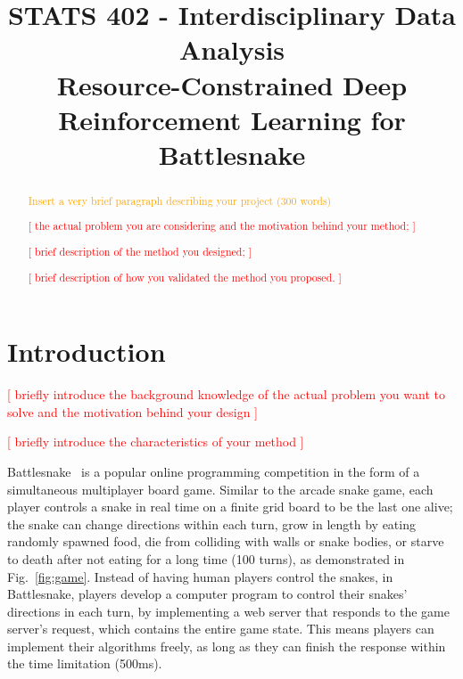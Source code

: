 \documentclass[conference]{IEEEtran}
\title{STATS 402 - Interdisciplinary Data Analysis\\
    Resource-Constrained Deep Reinforcement Learning for Battlesnake
}
\author{\IEEEauthorblockN{Steven Hé (Sīchàng)\\
    sichang.he@dukekunshan.edu.cn
}}
\newcommand{\todo}[1]{\textcolor{red}{[ #1 ]}}
\newcommand{\instruction}[1]{\textcolor{orange}{#1}}
\begin{document}
\maketitle

\begin{abstract}
    \instruction{Insert a very brief paragraph describing your project (300 words)}

    \todo{the actual problem you are considering and the motivation behind your method;}

    \todo{brief description of the method you designed;}

    \todo{brief description of how you validated the method you proposed.}
\end{abstract}

\section{Introduction}

\todo{briefly introduce the background knowledge of the actual problem
    you want to solve and the motivation behind your design
}

\todo{briefly introduce the characteristics of your method}

Battlesnake~\cite{battlesnake}
is a popular online programming competition in the form of a simultaneous
multiplayer board game. Similar to the arcade snake game,
each player controls a snake in real time on a finite grid board to be the last
one alive; the snake can change directions within each turn,
grow in length by eating randomly spawned food,
die from colliding with walls or snake bodies,
or starve to death after not eating for a long time (100 turns),
as demonstrated in Fig.~\ref{fig:game}.
Instead of having human players control the snakes, in Battlesnake,
players develop a computer program to control their snakes' directions in each
turn, by implementing a web server that responds to the game server's request,
which contains the entire game state.
This means players can implement their algorithms freely,
as long as they can finish the response within the time limitation (500ms).
\end{document}
